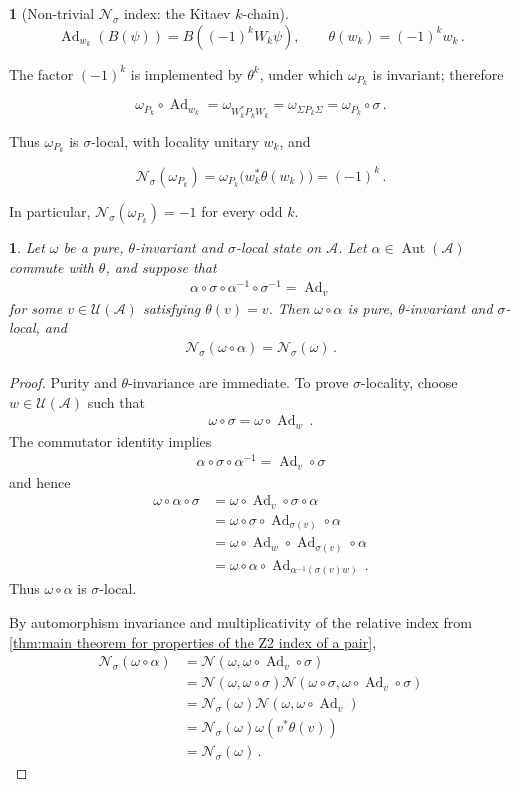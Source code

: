 \documentclass[a4paper,10pt]{article}
\numberwithin{equation}{section}
\theoremstyle{plain}
\theoremstyle{plain}
\theoremstyle{plain}
\theoremstyle{plain}
\theoremstyle{plain}
\newtheorem{claim}[claim]{\protect\claimname}
\theoremstyle{remark}
\theoremstyle{definition}
\newtheorem{example}[example]{\protect\examplename}
\providecommand{\claimname}{Claim}
\providecommand{\examplename}{Example}
\newcommand{\calA}{\mathcal{A}}
\newcommand{\calN}{\mathcal{N}}
\newcommand{\calU}{\mathcal{U}}
\newcommand{\Ad}[1]{\operatorname{Ad}_{#1}}
\newcommand{\eq}[1]{\begin{align*}#1\end{align*}}
\begin{document}
\begin{example}[Non-trivial \(\calN_\sigma\) index: the Kitaev \(k\)-chain]
$$
\Ad{w_k}(B(\psi))=B((-1)^kW_k\psi),
\qquad
\theta(w_k)=(-1)^kw_k\,.
$$

The factor \((-1)^k\) is implemented by \(\theta^k\), under which \(\omega_{P_k}\) is invariant; therefore

$$
\omega_{P_k}\circ\Ad{w_k}
=\omega_{W_k^*P_kW_k}
=\omega_{\Sigma P_k\Sigma}
=\omega_{P_k}\circ\sigma\,.
$$

Thus \(\omega_{P_k}\) is \(\sigma\)-local, with locality unitary \(w_k\), and

$$
\calN_\sigma(\omega_{P_k})
=\omega_{P_k}\bigl(w_k^*\theta(w_k)\bigr)
=(-1)^k\,.
$$

In particular, \(\calN_\sigma(\omega_{P_k})=-1\) for every odd \(k\).
\end{example}
\begin{claim}
\label{claim:symmetric local automorphism invariance}
Let \(\omega\) be a pure, \(\theta\)-invariant and \(\sigma\)-local
state on \(\calA\). Let
\(\alpha\in\operatorname{Aut}(\calA)\) commute with \(\theta\), and
suppose that
\eq{
    \alpha\circ\sigma\circ\alpha^{-1}\circ\sigma^{-1}
    =
    \Ad{v}
}
for some \(v\in\calU(\calA)\) satisfying \(\theta(v)=v\).
Then \(\omega\circ\alpha\) is pure, \(\theta\)-invariant and
\(\sigma\)-local, and
\eq{
    \calN_\sigma(\omega\circ\alpha)
    =
    \calN_\sigma(\omega)\,.
}
\end{claim}

\begin{proof}
Purity and \(\theta\)-invariance are immediate. To prove
\(\sigma\)-locality, choose \(w\in\calU(\calA)\) such that
\eq{
    \omega\circ\sigma
    =
    \omega\circ\Ad{w}\,.
}
The commutator identity implies
\eq{
    \alpha\circ\sigma\circ\alpha^{-1}
    =
    \Ad{v}\circ\sigma
}
and hence
\eq{
    \omega\circ\alpha\circ\sigma
    &=
    \omega\circ\Ad{v}\circ\sigma\circ\alpha
    \\
    &=
    \omega\circ\sigma\circ\Ad{\sigma(v)}\circ\alpha
    \\
    &=
    \omega\circ\Ad{w}\circ\Ad{\sigma(v)}\circ\alpha
    \\
    &=
    \omega\circ\alpha\circ
    \Ad{\alpha^{-1}\left(\sigma(v)w\right)}\,.
}
Thus \(\omega\circ\alpha\) is \(\sigma\)-local.

By automorphism invariance and multiplicativity of the relative index
from
\cref{thm:main theorem for properties of the Z2 index of a pair},
\eq{
    \calN_\sigma(\omega\circ\alpha)
    &=
    \calN\left(
        \omega,
        \omega\circ\Ad{v}\circ\sigma
    \right)
    \\
    &=
    \calN(\omega,\omega\circ\sigma)
    \calN\left(
        \omega\circ\sigma,
        \omega\circ\Ad{v}\circ\sigma
    \right)
    \\
    &=
    \calN_\sigma(\omega)
    \calN\left(
        \omega,
        \omega\circ\Ad{v}
    \right)
    \\
    &=
    \calN_\sigma(\omega)
    \omega\left(v^\ast\theta(v)\right)
    \\
    &=
    \calN_\sigma(\omega)\,.
}
\end{proof}
\end{document}
